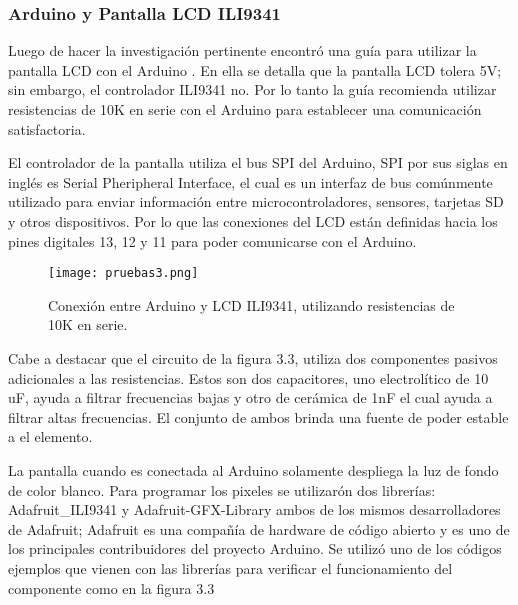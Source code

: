 \subsubsection{Arduino y Pantalla LCD ILI9341}

\par 
Luego de hacer la investigación pertinente encontró una guía para utilizar la pantalla LCD con el Arduino \cite{edu8tv}. En ella se detalla que la pantalla LCD tolera 5V; sin embargo, el controlador ILI9341 no. Por lo tanto la guía recomienda utilizar resistencias de 10K en serie con el Arduino para establecer una comunicación satisfactoria.

\par \noindent
El controlador de la pantalla utiliza el bus SPI del Arduino, SPI por sus siglas en inglés es Serial Pheripheral Interface, el cual es un interfaz de bus comúnmente utilizado para enviar información entre microcontroladores, sensores, tarjetas SD y otros dispositivos. Por lo que las conexiones del LCD están definidas hacia los pines digitales 13, 12 y 11 para poder comunicarse con el Arduino.

\begin{figure}[H]
	\centering
	\texttt{[image: pruebas3.png]}
	\caption{Conexión entre Arduino y LCD ILI9341, utilizando resistencias de 10K en serie.}
\end{figure}

\clearpage

\par \noindent
Cabe a destacar que el circuito de la figura 3.3, utiliza dos componentes pasivos adicionales a las resistencias. Estos son dos capacitores, uno electrolítico de 10 uF, ayuda a filtrar frecuencias bajas y otro de cerámica de 1nF el cual ayuda a filtrar altas frecuencias. El conjunto de ambos brinda una fuente de poder estable a el elemento.

\par \noindent
La pantalla cuando es conectada al Arduino solamente despliega la luz de fondo de color blanco. Para programar los pixeles se utilizarón dos librerías: Adafruit\_ILI9341\cite{adafruit-lcd} y Adafruit-GFX-Library\cite{adafruit-gfx} ambos de los mismos desarrolladores de Adafruit; Adafruit es una compañía de hardware de código abierto y es uno de los principales contribuidores del proyecto Arduino. Se utilizó uno de los códigos ejemplos que vienen con las librerías para verificar el funcionamiento del componente como en la figura 3.3

